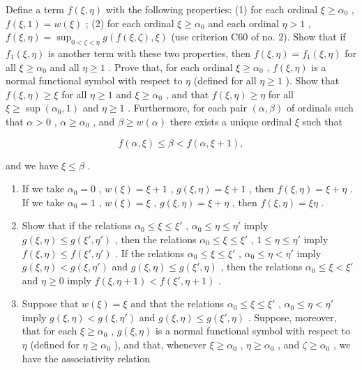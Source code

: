Define a term \(f(\xi, \eta)\) with the following properties: (1) for each ordinal \(\xi \geqslant \alpha_0\) , \(f(\xi, 1) = w(\xi)\) ; (2) for each ordinal \(\xi \geqslant \alpha_0\) and each ordinal \(\eta > 1\) , \(f(\xi, \eta) = \sup_{0 < \zeta < \eta} g(f(\xi, \zeta), \xi)\) (use criterion C60 of no. 2). Show that if \(f_1(\xi, \eta)\) is another term with these two properties, then \(f(\xi, \eta) = f_1(\xi, \eta)\) for all \(\xi \geqslant \alpha_0\) and all \(\eta \geqslant 1\) . Prove that, for each ordinal \(\xi \geqslant \alpha_0\) , \(f(\xi, \eta)\) is a normal functional symbol with respect to \(\eta\) (defined for all \(\eta \geqslant 1\) ). Show that \(f(\xi, \eta) \geqslant \xi\) for all \(\eta \geqslant 1\) and \(\xi \geqslant \alpha_0\) , and that \(f(\xi, \eta) \geqslant \eta\) for all \(\xi \geqslant \sup (\alpha_0, 1)\) and \(\eta \geqslant 1\) . Furthermore, for each pair \((\alpha, \beta)\) of ordinals such that \(\alpha > 0\) , \(\alpha \geqslant \alpha_0\) , and \(\beta \geqslant w(\alpha)\) there exists a unique ordinal \(\xi\) such that

\[
f (\alpha , \xi) \leqslant \beta <   f (\alpha , \xi + 1),
\]

and we have \(\xi \leqslant \beta\) .

\begin{enumerate}
\def\labelenumi{(\alph{enumi})}
\setcounter{enumi}{2}
\item
  If we take \(\alpha_0 = 0\) , \(w(\xi) = \xi + 1\) , \(g(\xi, \eta) = \xi + 1\) , then \(f(\xi, \eta) = \xi + \eta\) . If we take \(\alpha_0 = 1\) , \(w(\xi) = \xi\) , \(g(\xi, \eta) = \xi + \eta\) , then \(f(\xi, \eta) = \xi \eta\) .
\item
  Show that if the relations \(\alpha_0 \leqslant \xi \leqslant \xi'\) , \(\alpha_0 \leqslant \eta \leqslant \eta'\) imply \(g(\xi, \eta) \leqslant g(\xi', \eta')\) , then the relations \(\alpha_0 \leqslant \xi \leqslant \xi'\) , \(1 \leqslant \eta \leqslant \eta'\) imply \(f(\xi, \eta) \leqslant f(\xi', \eta')\) . If the relations \(\alpha_0 \leqslant \xi \leqslant \xi'\) , \(\alpha_0 \leqslant \eta < \eta'\) imply \(g(\xi, \eta) < g(\xi, \eta')\) and \(g(\xi, \eta) \leqslant g(\xi', \eta)\) , then the relations \(\alpha_0 \leqslant \xi < \xi'\) and \(\eta \geqslant 0\) imply \(f(\xi, \eta + 1) < f(\xi', \eta + 1)\) .
\item
  Suppose that \(w(\xi) = \xi\) and that the relations \(\alpha_0 \leqslant \xi \leqslant \xi'\) , \(\alpha_0 \leqslant \eta < \eta'\) imply \(g(\xi, \eta) < g(\xi, \eta')\) and \(g(\xi, \eta) \leqslant g(\xi', \eta)\) . Suppose, moreover, that for each \(\xi \geqslant \alpha_0\) , \(g(\xi, \eta)\) is a normal functional symbol with respect to \(\eta\) (defined for \(\eta \geqslant \alpha_0\) ), and that, whenever \(\xi \geqslant \alpha_0\) , \(\eta \geqslant \alpha_0\) , and \(\zeta \geqslant \alpha_0\) , we have the associativity relation
\end{enumerate}


